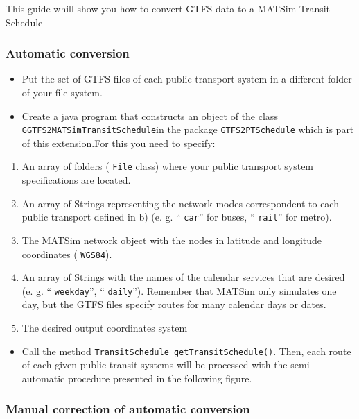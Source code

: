 \documentclass[a4paper,11pt]{report}
\begin{document}
This guide whill show you how to convert GTFS data to a MATSim Transit Schedule

\subsubsection{Automatic conversion}
\begin{itemize}
	\item Put the set of GTFS files of each public transport system in a different folder of your file system.
	\item Create a java program that constructs an object of the class
\texttt{GGTFS2MATSimTransitSchedule}in the package 
\texttt{GTFS2PTSchedule} which is part of this extension.For this you need to specify:
\end{itemize}
\begin{enumerate}
	\item An array of folders (
\texttt{File} class) where your public transport system specifications are located.
	\item An array of Strings representing the network modes correspondent to each public transport defined in b) (e. g. “
\texttt{car}” for buses, “
\texttt{rail}” for metro).
	\item The MATSim network object with the nodes in latitude and longitude coordinates (
\texttt{WGS84}).
	\item An array of Strings with the names of the calendar services that are desired (e. g. “
\texttt{weekday}”, “
\texttt{daily}”). Remember that MATSim only simulates one day, but the GTFS files specify routes for many calendar days or dates.
	\item The desired output coordinates system
\end{enumerate}
\begin{itemize}
	\item Call the method 
\texttt{TransitSchedule getTransitSchedule()}.  Then, each route of each given public transit systems will be processed  with the semi-automatic procedure presented in the following figure.
\\
\end{itemize}



\subsubsection{Manual correction of automatic conversion}
\end{document}
